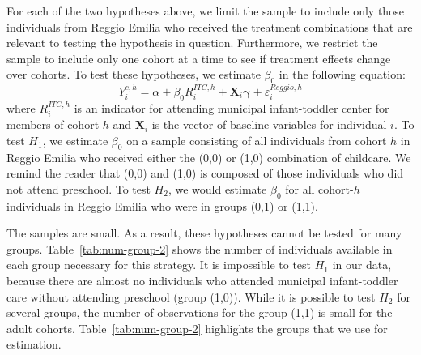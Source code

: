 For each of the two hypotheses above, we limit the sample to include only those individuals from Reggio Emilia who received the treatment combinations that are relevant to testing the hypothesis in question. Furthermore, we restrict the sample to include only one cohort at a time to see if treatment effects change over cohorts. To test these hypotheses, we estimate $\beta_{0}$ in the following equation:
\begin{equation}
Y_{i}^{c,h} = \alpha + \beta_{0}R_i^{ITC,h} + \mathbf{X}_i \bm{\gamma} + \varepsilon_{i}^{Reggio,h}
\end{equation}
where $R_i^{ITC,h}$ is an indicator for attending municipal infant-toddler center for members of cohort $h$ and $\mathbf{X}_i$ is the vector of baseline variables for individual $i$. To test $H_1$, we estimate $\beta_0$ on a sample consisting of all individuals from cohort $h$ in Reggio Emilia who received either the (0,0) or (1,0) combination of childcare. We remind the reader that (0,0) and (1,0) is composed of those individuals who did not attend preschool. To test $H_2$, we would estimate $\beta_0$ for all cohort-$h$ individuals in Reggio Emilia who were in groups (0,1) or (1,1).

The samples are small. As a result, these hypotheses cannot be tested for many groups. Table~\ref{tab:num-group-2} shows the number of individuals available in each group necessary for this strategy. It is impossible to test $H_1$ in our data, because there are almost no individuals who attended municipal infant-toddler care without attending preschool (group (1,0)). While it is possible to test $H_2$ for several groups, the number of observations for the group (1,1) is small for the adult cohorts. Table~\ref{tab:num-group-2} highlights the groups that we use for estimation.


